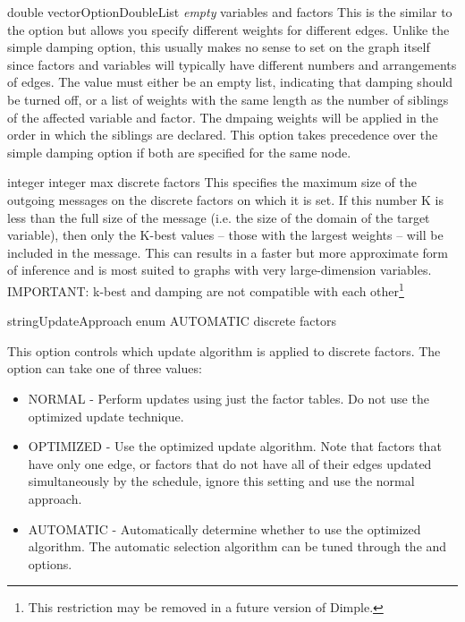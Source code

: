 
{\ifmatlab double vector\fi \ifjava OptionDoubleList\fi}
{\textit{empty}}
{variables and factors}
{This is the similar to the  option but allows you specify different weights for different edges. Unlike the simple damping option, this usually makes no sense to set on the graph itself since factors and variables will typically have different numbers and arrangements of edges. The value must either be an empty list, indicating that damping should be turned off, or a list of weights with the same length as the number of siblings of the affected variable and factor. The dmpaing weights will be applied in the order in which the siblings are declared.
\linebreak
\linebreak
This option takes precedence over the simple damping option if both are specified for the same node.
}


{integer}
{integer max}
{discrete factors}
{This specifies the maximum size of the outgoing messages on the discrete factors on which it is set. If this number K is less than the full size of the message (i.e. the size of the domain of the target variable), then only the K-best values -- those with the largest weights -- will be included in the message. This can results in a faster but more approximate form of inference and is most suited to graphs with very large-dimension variables.
\linebreak
\linebreak
IMPORTANT: k-best and damping are not compatible with each other\footnote{This restriction may be removed in a future version of Dimple.}}


{\ifmatlab string\fi \ifjava UpdateApproach enum\fi}
{AUTOMATIC}
{discrete factors}
{This option controls which update algorithm is applied to discrete factors. The option can take one of three values:
\begin{itemize}
\item NORMAL - Perform updates using just the factor tables. Do not use the optimized update technique.
\item OPTIMIZED - Use the optimized update algorithm. Note that factors that have only one edge, or factors that do not have all of their edges updated simultaneously by the schedule, ignore this setting and use the normal approach.
\item AUTOMATIC - Automatically determine whether to use the optimized algorithm. The automatic selection algorithm can be tuned through the  and  options.
\end{itemize}
}

